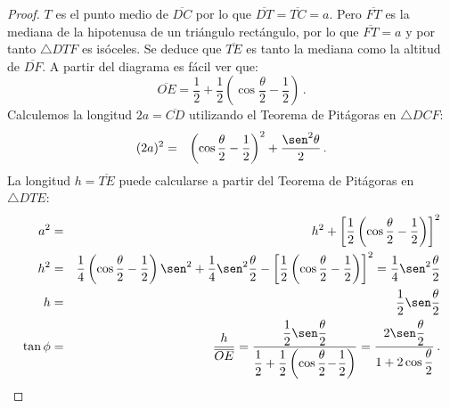 \begin{proof}
$T$ es el punto medio de $\overline{DC}$ por lo que $\overline{DT}=\overline{TC}=a$. Pero $\overline{FT}$ es la mediana de la hipotenusa de un triángulo rectángulo, por lo que $\overline{FT}=a$ y por tanto $\triangle DTF$ es isóceles. Se deduce que $\overline{TE}$ es tanto la mediana como la altitud de $\overline{DF}$. A partir del diagrama es fácil ver que:
\[
\overline{OE}=\frac{1}{2} + \frac{1}{2}\left(\cos \frac{\theta}{2}-\frac{1}{2}\right)\,.
\]
Calculemos la longitud $2a=\overline{CD}$ utilizando el Teorema de Pitágoras en $\triangle DCF$:
\begin{eqnarray*}
(2a)^2 &=&  \left(\cos \frac{\theta}{2}-\frac{1}{2}\right)^2+\frac{\sen^2\theta}{2}\,.
\end{eqnarray*}
La longitud $h=\overline{TE}$ puede calcularse a partir del Teorema de Pitágoras en $\triangle DTE$:
\begin{eqnarray*}
a^2 &=& h^2 + \left[\frac{1}{2}\left(\cos \frac{\theta}{2}-\frac{1}{2}\right)\right]^2\\
h^2&=&\frac{1}{4}\left(\cos \frac{\theta}{2}-\frac{1}{2}\right)\sen^2+\frac{1}{4}\sen^2\frac{\theta}{2}-\left[\frac{1}{2}\left(\cos \frac{\theta}{2}-\frac{1}{2}\right)\right]^2=
\frac{1}{4}\sen^2\frac{\theta}{2}\\
h&=&\frac{1}{2}\sen\frac{\theta}{2}\\
\tan\phi &=&\frac{h}{\overline{OE}}=\displaystyle\frac{\displaystyle\frac{1}{2}\sen\frac{\theta}{2}}{\displaystyle\frac{1}{2}+\frac{1}{2}\left(\cos \frac{\theta}{2}\! -\! \frac{1}{2}\right)}
=\frac{\displaystyle2\sen\frac{\theta}{2}}{\displaystyle 1+2\cos\frac{\theta}{2}}\,.
\end{eqnarray*}                  
\end{proof}

